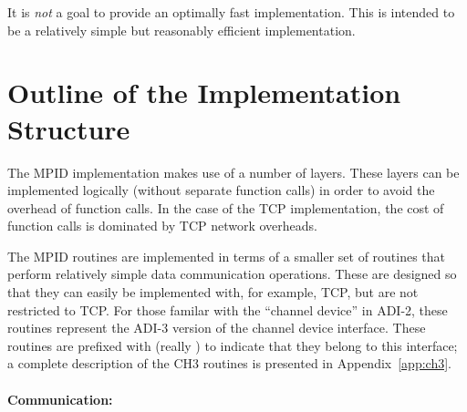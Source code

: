 \documentclass{article}
\begin{document}
It is \emph{not} a goal to provide an optimally fast implementation. This is
intended to be a relatively simple but reasonably efficient implementation.


\section{Outline of the Implementation Structure}
\label{sec:impl-outline}

The MPID implementation makes use of a number of layers.  These layers
can be implemented logically (without separate function calls) in
order to avoid the overhead of function calls.  In the case of the TCP
implementation, the cost of function calls is dominated by TCP network
overheads.  


The MPID routines are implemented in terms of a smaller set of routines that
perform relatively simple data communication operations.  These are designed
so that they can easily be implemented with, for example, TCP, but are not
restricted to TCP.  For those familar with the ``channel device'' in ADI-2,
these routines represent the ADI-3 version of the channel device interface.
These routines are prefixed with  (really ) to
indicate that they belong to 
this interface; a complete description of the CH3 routines is presented in
Appendix~\ref{app:ch3}. 

\paragraph{Communication:}
\end{document}
